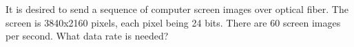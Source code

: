 
\section{}
It is desired to send a sequence of computer screen images over optical fiber. The screen is 3840x2160 pixels, each pixel being 24 bits. There are 60 screen images per second. What data rate is needed?


\section{}
\section{}
\section{}
\section{}
\section{}
\section{}
